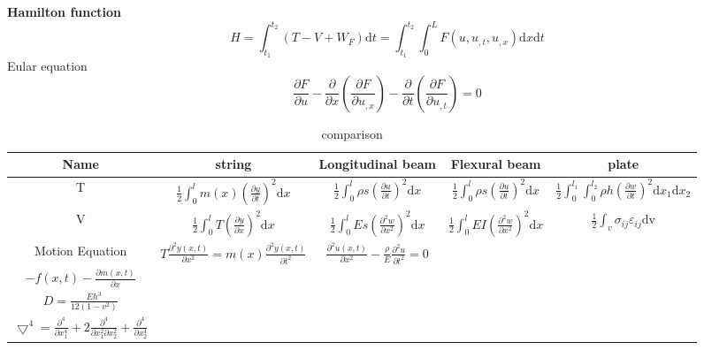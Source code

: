 \documentclass{article}
\begin{document}
\begin{multicols*}{2}
  \item\textbf{Hamilton function}
\begin{equation*}
  H=\int_{t_{1}}^{t_{2}}(T-V+W_{F})\text{d}t
  =\int_{t_{1}}^{t_{2}}\int_{0}^{L}F(u,u_{,t},u_{,x})\text{d}x\text{d}t
\end{equation*}
Eular equation
\begin{equation*}
  \frac{\partial F}{\partial u}-\frac{\partial}{\partial x}(\frac{\partial F}{\partial u_{,x}})-\frac{\partial}{\partial t}(\frac{\partial F}{\partial u_{,t}})=0
\end{equation*}
  \begin{table*}
    \centering
    \caption{comparison}
    \begin{tabular}{|c|c|c|c|c|}
      \hline
      Name&string&Longitudinal beam& Flexural beam&plate\\
      \hline
      T&$\frac{1}{2}\int_{0}^{l}m(x)(\frac{\partial y}{\partial t})^{2}\text{d}x$
      &$\frac{1}{2}\int_{0}^{l}\rho s(\frac{\partial u}{\partial t})^{2}\text{d}x$
      &$\frac{1}{2}\int_{0}^{l}\rho s(\frac{\partial u}{\partial t})^{2}\text{d}x$
      &$\frac{1}{2}\int_{0}^{l_{1}}\int_{0}^{l_{2}}\rho h(\frac{\partial w}{\partial t})^{2}\text{d}x_{1}\text{d}x_{2}$\\ 
      \hline
      V&$\frac{1}{2}\int_{0}^{l}T(\frac{\partial y}{\partial x})^{2}\text{d}x$
      &$\frac{1}{2}\int_{0}^{l}Es(\frac{\partial^{2} w}{\partial x^{2}})^{2}\text{d}x$
      &$\frac{1}{2}\int_{0}^{l}EI(\frac{\partial^{2} w}{\partial x^{2}})^{2}\text{d}x$
      &$\frac{1}{2}\int_{v}\sigma_{ij}\varepsilon_{ij} \text{d}$v\\
      \hline
      Motion Equation&$T\frac{\partial ^{2}y(x,t)}{\partial x^{2}}=m(x)\frac{\partial^{2}y(x,t)}{\partial t^{2}}$
      &$\frac{\partial^{2}u(x,t)}{\partial x^{2}}-\frac{\rho}{E}\frac{\partial^{2}u}{\partial t^{2}}=0$
      &\makecell[c]{$\frac{\partial ^{2}}{\partial x^{2}}(EI\frac{\partial^{2}w}{\partial x^{2}})+\rho s \frac{\partial^{2}w}{\partial t^{2}}=$ \\ $-f(x,t)-\frac{\partial m(x,t)}{\partial x}$}
      &\makecell[c]{$D \bigtriangledown ^{4}w+\rho h \frac{\partial ^{2}}{\partial t^{2}}=f$\\
      $D=\frac{Eh^{3}}{12(1-v^{2})}$\\$\bigtriangledown^{4}=\frac{\partial ^{4}}{\partial x_{1}^{4}}+2\frac{\partial ^{4}}{\partial x_{1}^{2}\partial x_{2}^{2}}+\frac{\partial ^{4}}{\partial x_{2}^{4}}$}\\
      \hline
    \end{tabular}
  \end{table*}
 

\end{multicols*}
\end{document}
